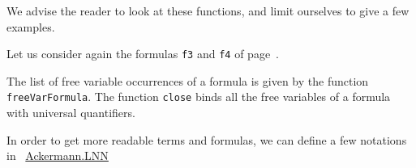 We advise the reader to look at these functions, and limit ourselves to give a few examples.

Let us consider again the formulas \texttt{f3} and \texttt{f4} of page~\pageref{fol:examplesf1f2f3}.

The list of free variable occurrences of a formula is given by the function \texttt{freeVarFormula}. The function \texttt{close}
binds all the free variables of a formula with universal quantifiers.






In order to get more readable terms and formulas, we can define a few notations in ~\href{../theories/html/hydras.Ackermann.LNN.html}{Ackermann.LNN}


